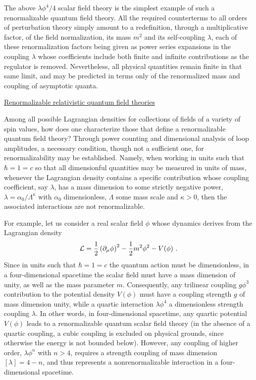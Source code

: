 \documentclass[a4paper,11pt]{article}
\begin{document}
The above $\lambda\phi^4/4$ scalar field theory is the simplest example
of such a renormalizable quantum field theory. All the required counterterms
to all orders of perturbation theory simply amount to a redefinition, through 
a multiplicative factor, of the field normalization, its mass $m^2$ and its
self-coupling $\lambda$, each of these renormalization factors being given
as power series expansions in the coupling $\lambda$ whose coefficients
include both finite and infinite contributions as the regulator is
removed. Nevertheless, all physical quantities remain finite in that same 
limit, and may be predicted in terms only of the renormalized mass and 
coupling of asymptotic quanta.


\vspace{10pt}

\noindent\underline{Renormalizable relativistic quantum field theories}

\vspace{5pt}

Among all possible Lagrangian densities for collections of fields of
a variety of spin values, how does one characterize those that define
a renormalizable quantum field theory? Through power counting and
dimensional analysis of loop amplitudes, a necessary
condition, though not a sufficient one, for renormalizability may be
established. Namely, when working in units such that $\hbar=1=c$
so that all dimensionful quantities may be measured in units of mass,
whenever the Lagrangian density contains a specific contribution
whose coupling coefficient, say $\lambda$, has a mass dimension to some 
strictly negative power, $\lambda=\alpha_0/\Lambda^\kappa$ with $\alpha_0$
dimensionless, $\Lambda$ some mass scale and $\kappa>0$, then the associated 
interactions are not renormalizable.

For example, let us consider a real scalar field $\phi$ whose dynamics
derives from the Lagrangian density
\begin{equation}
{\cal L}=\frac{1}{2}\left(\partial_\mu\phi\right)^2-\frac{1}{2}m^2\phi^2-
V(\phi)\ .
\end{equation}
Since in units such that $\hbar=1=c$ the quantum action must be dimensionless,
in a four-dimensional spacetime the scalar field must have a mass dimension
of unity, as well as the mass parameter $m$. Consequently, any trilinear
coupling $g\phi^3$ contribution to the potential density $V(\phi)$ must
have a coupling strength $g$ of mass dimension unity, while a quartic
interaction $\lambda\phi^4$ a dimensionless strength coupling $\lambda$. 
In other words, in four-dimensional spacetime, any quartic potential $V(\phi)$
leads to a renormalizable quantum scalar field theory (in the absence of
a quartic coupling, a cubic coupling is excluded on physical grounds, since
otherwise the energy is not bounded below). However, any coupling of
higher order, $\lambda\phi^n$ with $n>4$, requires a strength coupling of mass
dimension $[\lambda]=4-n$, and thus represents a nonrenormalizable interaction
in a four-dimensional spacetime.
\end{document}
